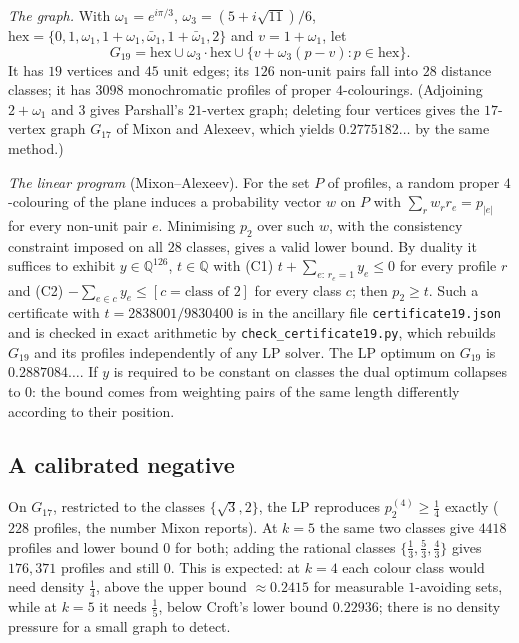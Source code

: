 \documentclass[11pt,a4paper]{amsart}
\theoremstyle{remark}
\newcommand{\Q}{\mathbb{Q}}
\begin{document}
\noindent\emph{The graph.} With $\omega_1=e^{i\pi/3}$, $\omega_3=(5+i\sqrt{11})/6$, $\mathrm{hex}=\{0,1,\omega_1,1+\omega_1,\bar\omega_1,1+\bar\omega_1,2\}$ and $v=1+\omega_1$, let
\[
G_{19}=\mathrm{hex}\cup\omega_3\cdot\mathrm{hex}\cup\{v+\omega_3(p-v):p\in\mathrm{hex}\}.
\]
It has $19$ vertices and $45$ unit edges; its $126$ non-unit pairs fall into $28$ distance classes; it has $3098$ monochromatic profiles of proper $4$-colourings. (Adjoining $2+\omega_1$ and $3$ gives Parshall's $21$-vertex graph; deleting four vertices gives the $17$-vertex graph $G_{17}$ of Mixon and Alexeev, which yields $0.2775182\ldots$ by the same method.)

\noindent\emph{The linear program} (Mixon--Alexeev). For the set $P$ of profiles, a random proper $4$-colouring of the plane induces a probability vector $w$ on $P$ with $\sum_r w_rr_e=p_{|e|}$ for every non-unit pair $e$. Minimising $p_2$ over such $w$, with the consistency constraint imposed on all $28$ classes, gives a valid lower bound. By duality it suffices to exhibit $y\in\Q^{126}$, $t\in\Q$ with (C1) $t+\sum_{e:\,r_e=1}y_e\le0$ for every profile $r$ and (C2) $-\sum_{e\in c}y_e\le[c=\text{class of }2]$ for every class $c$; then $p_2\ge t$. Such a certificate with $t=2838001/9830400$ is in the ancillary file \texttt{certificate19.json} and is checked in exact arithmetic by \texttt{check\_certificate19.py}, which rebuilds $G_{19}$ and its profiles independently of any LP solver. The LP optimum on $G_{19}$ is $0.2887084\ldots$. If $y$ is required to be constant on classes the dual optimum collapses to $0$: the bound comes from weighting pairs of the same length differently according to their position.

\subsection{A calibrated negative}

On $G_{17}$, restricted to the classes $\{\sqrt3,2\}$, the LP reproduces $p^{(4)}_2\ge\tfrac14$ exactly ($228$ profiles, the number Mixon reports). At $k=5$ the same two classes give $4418$ profiles and lower bound $0$ for both; adding the rational classes $\{\tfrac13,\tfrac53,\tfrac43\}$ gives $176{,}371$ profiles and still $0$. This is expected: at $k=4$ each colour class would need density $\tfrac14$, above the upper bound $\approx0.2415$ for measurable $1$-avoiding sets, while at $k=5$ it needs $\tfrac15$, below Croft's lower bound $0.22936$; there is no density pressure for a small graph to detect.
\end{document}
